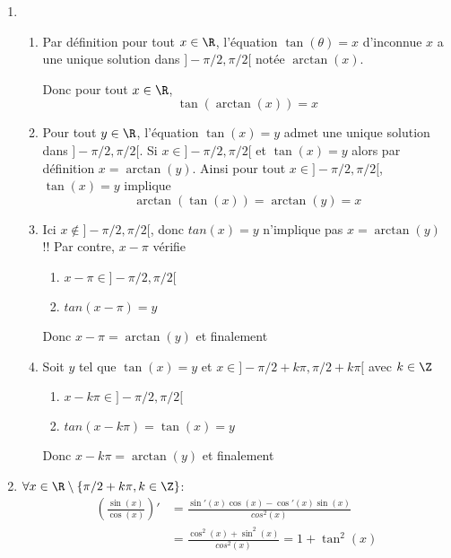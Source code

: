 \begin{correction}
\begin{enumerate}
\item \begin{enumerate}
\item 
Par définition pour tout $x\in \R$, l'équation $\tan(\theta)=x$ d'inconnue $x$ a une unique solution dans $]-\pi/2, \pi/2[$ notée $\arctan (x)$. 

Donc pour tout $x\in \R$, $$\tan(\arctan(x))=x$$

\item Pour tout  $y \in \R$, l'équation $\tan(x)=y$ admet une unique solution dans $]-\pi/2, \pi/2[$. 
Si $x\in  ]-\pi/2, \pi/2[$ et $\tan(x)=y$ alors par définition $x=\arctan (y)$. Ainsi pour tout $x\in ]-\pi/2, \pi/2[$, $\tan(x)=y$ implique 
$$\arctan(\tan(x))= \arctan(y) = x$$

\item Ici $x \notin ]-\pi/2, \pi/2[$, donc $tan(x)=y$ n'implique pas 
$x=\arctan(y)$ !! Par contre, $x-\pi $ vérifie 
\begin{enumerate}
\item $x-\pi \in   ]-\pi/2, \pi/2[$
\item  $tan(x-\pi)=y$
\end{enumerate}
Donc $x-\pi = \arctan(y)$ et finalement 
\conclusion{$ \forall x\in ]\pi/2, 3\pi/2[, \, \arctan(\tan(x)) = \arctan(y) =x-\pi$}


\item Soit $y$ tel que $\tan(x)=y$ et $x\in  ]-\pi/2+k\pi, \pi/2+k\pi[$ avec $k\in \Z$ 
\begin{enumerate}
\item $x-k \pi \in   ]-\pi/2, \pi/2[$
\item  $tan(x-k\pi)=\tan(x)=y$
\end{enumerate}
Donc $x-k\pi =\arctan(y)$ et finalement 
\conclusion{$ \forall x\in]-\pi/2+k\pi, \pi/2+k\pi[, \, \arctan(\tan(x)) = \arctan(y) =x-k\pi$}


\end{enumerate}


\item $\forall x\in \R\setminus \{ \pi/2 +k\pi, k\in \Z\}$:
\begin{align*}
\left(\frac{\sin(x)}{\cos(x)}\right)'&=\frac{\sin'(x)\cos(x)-\cos'(x)\sin(x)}{cos^2(x)}\\
&=\frac{\cos^2(x)+\sin^2(x)}{cos^2(x)} =1+\tan^2(x)\\
\end{align*}



\end{enumerate}
\end{correction}
